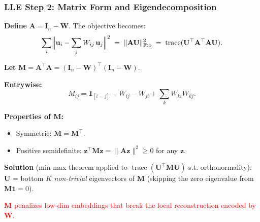 \documentclass[notes,11pt, aspectratio=169]{beamer}
\DeclareMathOperator{\trace}{trace}
\newcommand{\vu}{\mathbf{u}}
\newcommand{\vz}{\mathbf{z}}
\newcommand{\vA}{\mathbf{A}}
\newcommand{\vM}{\mathbf{M}}
\newcommand{\vU}{\mathbf{U}}
\newcommand{\vW}{\mathbf{W}}
\newcommand{\Frob}{\mathrm{Fro}}
\begin{document}
\begin{frame}
\frametitle{LLE Step 2: Matrix Form and Eigendecomposition}

\textbf{Define} $\vA = \mathbf{I}_n - \vW$. The objective becomes:
\[
    \sum_i \Bigl\| \vu_i - \sum_j W_{ij}\, \vu_j \Bigr\|^2
    \;=\; \|\vA \vU\|_\Frob^2
    \;=\; \trace(\vU^\top \vA^\top \vA \vU).
\]

\vspace{6pt}
\textbf{Let} $\vM = \vA^\top \vA = (\mathbf{I}_n - \vW)^\top (\mathbf{I}_n - \vW)$.

\vspace{6pt}
\textbf{Entrywise:}
\[
    M_{ij} = \mathbf{1}_{[i=j]} - W_{ij} - W_{ji} + \sum_k W_{ki} W_{kj}.
\]

\vspace{6pt}
\textbf{Properties of $\vM$:}
\begin{itemize}
    \item Symmetric: $\vM = \vM^\top$.
    \item Positive semidefinite: $\vz^\top \vM \vz = \|\vA \vz\|^2 \geq 0$ for any $\vz$.
\end{itemize}

\vspace{6pt}
\textbf{Solution} (min-max theorem applied to $\trace(\vU^\top \vM \vU)$ s.t. orthonormality): $\vU$ = bottom $K$ \emph{non-trivial} eigenvectors of $\vM$ (skipping the zero eigenvalue from $\vM \mathbf{1} = 0$).

\vspace{4pt}
\textcolor{red}{$\vM$ penalizes low-dim embeddings that break the local reconstruction encoded by $\vW$.}
\end{frame}
\end{document}
